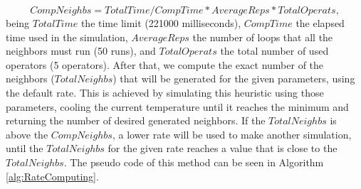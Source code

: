 \begin{equation} 
CompNeighbs = TotalTime / CompTime * AverageReps * TotalOperats,
\end{equation} being $TotalTime$ the time limit (221000 milliseconds), $CompTime$ the elapsed time used in the simulation, $AverageReps$ the number of loops that all the neighbors must run (50 runs), and $TotalOperats$ the total number of used operators (5 operators). After that, we compute the exact number of the neighbors ($TotalNeighbs$) that will be generated for the given parameters, using the default rate. This is achieved by simulating this heuristic using those parameters, cooling the current temperature until it reaches the minimum and returning the number of desired generated neighbors. If the $TotalNeighbs$ is above the $CompNeighbs$, a lower rate will be used to make another simulation, until the $TotalNeighbs$ for the given rate reaches a value that is close to the $TotalNeighbs$. The pseudo code of this method can be seen in Algorithm \ref{alg:RateComputing}.\\
\\
